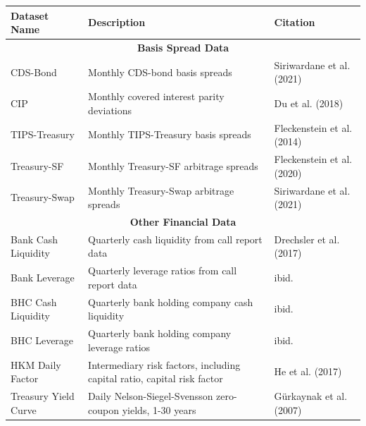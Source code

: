 \documentclass[ignorenonframetext, 9pt]{beamer}
\begin{document}
\begin{frame}[plain]
  \tiny
  \begin{table}
  \centering
  \begin{tabular}{p{2.5cm}p{5cm}p{2.5cm}}
  \toprule
  Dataset Name & Description & Citation \\
  \midrule
  \multicolumn{3}{c}{\textbf{Basis Spread Data}} \\
  \midrule
  CDS-Bond & Monthly CDS-bond basis spreads & Siriwardane et al. (2021) \\
  CIP & Monthly covered interest parity deviations & Du et al. (2018) \\
  TIPS-Treasury & Monthly TIPS-Treasury basis spreads & Fleckenstein et al. (2014) \\
  Treasury-SF & Monthly Treasury-SF arbitrage spreads & Fleckenstein et al. (2020) \\
  Treasury-Swap & Monthly Treasury-Swap arbitrage spreads & Siriwardane et al. (2021) \\
  \midrule
  \multicolumn{3}{c}{\textbf{Other Financial Data}} \\
  \midrule
  Bank Cash Liquidity & Quarterly cash liquidity from call report data & Drechsler et al. (2017) \\
  Bank Leverage & Quarterly leverage ratios from call report data & ibid. \\
  BHC Cash Liquidity & Quarterly bank holding company cash liquidity & ibid. \\
  BHC Leverage & Quarterly bank holding company leverage ratios & ibid. \\
  HKM Daily Factor & Intermediary risk factors, including capital ratio, capital risk factor & He et al. (2017) \\
  Treasury Yield Curve & Daily Nelson-Siegel-Svensson zero-coupon yields, 1-30 years & Gürkaynak et al. (2007) \\
  \bottomrule
  \end{tabular}
  \end{table}
\end{frame}
\end{document}
